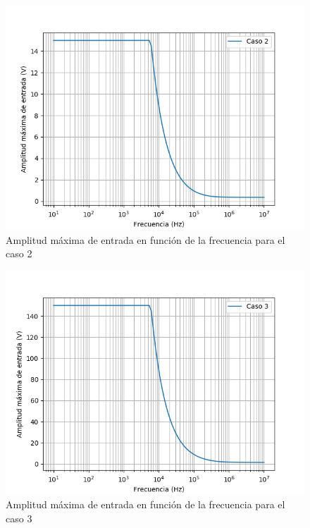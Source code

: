 \begin{figure}[H]
\begin{centering}
\includegraphics[scale=0.5]{../Ex1/iA/Resources1a/AmplMaxVsFreq2}
\par\end{centering}
\caption{Amplitud máxima de entrada en función de la frecuencia para el caso
2}
\label{1_a_24}

\end{figure}

\begin{figure}[H]
\begin{centering}
\includegraphics[scale=0.5]{../Ex1/iA/Resources1a/AmplMaxVsFreq3}
\par\end{centering}
\caption{Amplitud máxima de entrada en función de la frecuencia para el caso
3}
\label{1_a_25}

\end{figure}

